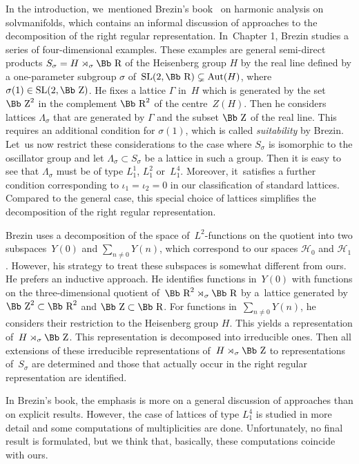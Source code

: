 \documentclass[pdftex]{sigma}
\newcommand\RR{{\mbox{\Bb R}}}
\newcommand\ZZ{{\mbox{\Bb Z}}}
\newcommand\cH{{\mathcal H}}
\newcommand{\Aut}{\mathop{{\rm Aut}}}
\newcommand{\SL}{\mathop{{\rm SL}}}
\numberwithin{equation}{section}
\begin{document}
\begin{Remark}\label{RBr}
In the introduction, we~mentioned Brezin's book~\cite{Br} on harmonic analysis on solvmanifolds, which contains an informal discussion of approaches to the decomposition of the right regular representation. In~Chapter 1, Brezin studies a series of four-dimensional examples. These examples are general semi-direct products $S_\sigma=H\rtimes _\sigma\RR$ of the Heisenberg group $H$ by the real line defined by a one-parameter subgroup $\sigma$ of~$\SL(2,\RR)\subsetneq \Aut(H)$, where $\sigma(1)\in\SL(2,\ZZ)$. He fixes a lattice $\Gamma$ in~$H$ which is generated by the set $\ZZ^2$ in the complement $\RR^2$ of the centre~$Z(H)$. Then he considers lattices $\Lambda_\sigma$ that are generated by $\Gamma$ and the subset $\ZZ$ of the real line. This requires an additional condition for $\sigma(1)$, which is called \emph{suitability} by Brezin. Let~us now restrict these considerations to the case where $S_\sigma$ is isomorphic to the oscillator group and let $\Lambda_\sigma\subset S_\sigma$ be a lattice in such a group. Then it is easy to see that $\Lambda_\sigma$ must be of type $L_1^1$, $L_1^{2}$ or~$L_1^{4}$. Moreover, it~satisfies a further condition corresponding to $\iota_1=\iota_2=0$ in our classification of standard lattices. Compared to the general case, this special choice of lattices simplifies the decomposition of the right regular representation.

Brezin uses a decomposition of the space of~$L^2$-functions on the quotient into two subspaces~$Y(0)$ and $\sum_{n\not=0}Y(n)$, which correspond to our spaces $\cH_0$ and $\cH_1$. However, his strategy to treat these subspaces is somewhat different from ours. He prefers an inductive approach. He identifies functions in~$Y(0)$ with functions on the three-dimensional quotient of~$\RR^2\rtimes_\sigma\RR$ by a~lattice generated by $\ZZ^2\subset\RR^2$ and $\ZZ\subset\RR$. For functions in~$\sum_{n\not=0}Y(n)$, he considers their restriction to the Heisenberg group $H$. This yields a representation of~$H\rtimes_\sigma \ZZ$. This representation is decomposed into irreducible ones. Then all extensions of these irreducible representations of~$H\rtimes_\sigma \ZZ$ to representations of~$S_\sigma$ are determined and those that actually occur in the right regular representation are identified.

In Brezin's book, the emphasis is more on a general discussion of approaches than on explicit results.
However, the case of lattices of type $L_1^{4}$ is studied in more detail and some computations of multiplicities are done. Unfortunately, no final result is formulated, but we think that, basically, these computations coincide with ours.
\end{Remark}
\end{document}
